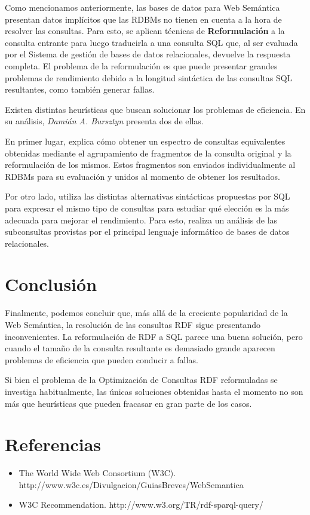 \documentclass[10pt,a4paper]{article}
\begin{document}
Como mencionamos anteriormente, las bases de datos para Web Semántica presentan datos implícitos que las RDBMs no tienen en cuenta a la hora de resolver las consultas. Para esto, se aplican técnicas de \textbf{Reformulación} a la consulta entrante para luego traducirla a una consulta SQL que, al ser evaluada por el Sistema de gestión de bases de datos relacionales, devuelve la respuesta completa. El problema de la reformulación es que puede presentar grandes problemas de rendimiento debido a la longitud sintáctica de las consultas SQL resultantes, como también generar fallas.

Existen distintas heurísticas que buscan solucionar los problemas de eficiencia. En su análisis, \textit{Damián A. Bursztyn} presenta dos de ellas.

En primer lugar, explica cómo obtener un espectro de consultas equivalentes obtenidas mediante el agrupamiento de fragmentos de la consulta original y la reformulación de los mismos. Estos fragmentos son enviados individualmente al RDBMs para su evaluación y unidos al momento de obtener los resultados.

Por otro lado, utiliza las distintas alternativas sintácticas propuestas por SQL para expresar el mismo tipo de consultas para estudiar qué elección es la más adecuada para mejorar el rendimiento. Para esto, realiza un análisis de las subconsultas provistas por el principal lenguaje informático de bases de datos relacionales.

\section{Conclusión}
Finalmente, podemos concluir que, más allá de la creciente popularidad de la Web Semántica, la resolución de las consultas RDF sigue presentando inconvenientes. La reformulación de RDF a SQL parece una buena solución, pero cuando el tamaño de la consulta resultante es demasiado grande aparecen problemas de eficiencia que pueden conducir a fallas. 

Si bien el problema de la Optimización de Consultas RDF reformuladas se investiga habitualmente, las únicas soluciones obtenidas hasta el momento no son más que heurísticas que pueden fracasar en gran parte de los casos.

\section{Referencias}

\begin{itemize}
\item The World Wide Web Consortium (W3C). http://www.w3c.es/Divulgacion/GuiasBreves/WebSemantica
\item W3C Recommendation. http://www.w3.org/TR/rdf-sparql-query/
\end{itemize}
\end{document}
